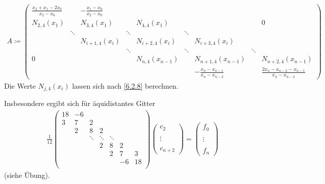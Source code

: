 

\label{5.2.18}
\begin{gather*}
  A \coloneqq 
  \left(
    \begin{array}{ccccccccc}
      \frac{x_2+x_1-2x_0}{x_2-x_0}
      & & -\frac{x_1-x_0}{x_2-x_0}& && & & & \\
      N_{2,4}(x_1)&&N_{3,4}(x_1) &&N_{4,4}(x_1)  & &&&0 \\
      &\ddots & &\ddots& &\ddots &  &&\\
      & & N_{i+1,4}(x_i)&& N_{i+2,4}(x_i) && N_{i+3,4}(x_i) && \\
      & &  &\ddots& &\ddots &&\ddots  &\\
      0&&&  &N_{n,4}(x_{n-1}) &&N_{n+1,4}(x_{n-1}) &&N_{n+2,4}(x_{n-1}) \\
      & & && && -\frac{x_n-x_{n-1}}{x_n-x_{n-2}} 
                                       && \frac{2x_n-x_{n-2}-x_{n-1}}{x_n-x_{n-2}}
    \end{array}
  \right)
\end{gather*}
Die Werte $N_{j,4}(x_i)$ lassen sich nach \ref{6.2.8} berechnen.

Insbesondere ergibt sich für äquidistantes Gitter
\begin{gather*}
  \frac{1}{12}
  \left(
    \begin{array}{ccccccc}
      18& -6&&&&&\\
      3&7&2&  &&&\\
        &2&8&2  &&&\\
        & &\ddots &\ddots &\ddots &&\\
        & & & 2&8&2&\\
        & & & &2&7&3\\
        & & &&&-6&18\\
    \end{array}
  \right) 
  \left(
    \begin{array}{c}
      c_2\\ \\ \vdots \\ \\c_{n+2}
    \end{array}\right)
  =
  \left(
    \begin{array}{c}
      f_0\\ \\ \vdots \\ \\f_n
    \end{array}
  \right)
\end{gather*}
(siehe Übung).

